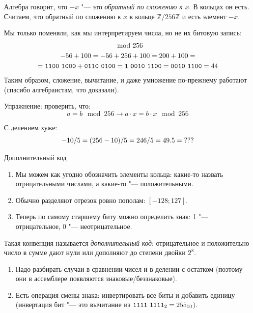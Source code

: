 \begin{frame}
	Алгебра говорит, что $-x$ "--- это \textit{обратный по сложению к $x$}.
	В кольцах он есть.
	Считаем, что обратный по сложению к $x$ в кольце $\mathbb{Z}/256\mathbb{Z}$ и есть элемент $-x$.

	Мы только поменяли, как мы интерпретируем числа, но не их битовую запись:
	\begin{gather*}
		\mod 256 \\
		-56 + 100 = -56 + 256 + 100 = 200 + 100 = \\
		= \t{1100~1000} + \t{0110~0100} = \t{1~0010~1100} = \t{0010~1100} = 44
	\end{gather*}
	Таким образом, сложение, вычитание, и даже умножение по-прежнему работают (спасибо алгебраистам, что доказали).

	Упражнение: проверить, что:
	\[ a = b \mod 256 \rightarrow a \cdot x = b \cdot x \mod 256\]

	С делением хуже:
	\[
		-10 / 5 = (256 - 10) / 5 = 246 / 5 = 49.5 = \t{???}
	\]
\end{frame}

\begin{frame}{Дополнительный код}
	\begin{enumerate}
		\item Мы можем как угодно обозначить элементы кольца: какие-то назвать отрицательными числами, а какие-то "--- положительными.
		\item Обычно разделяют отрезок ровно пополам: $[-128; 127]$.
		\item Теперь по самому старшему биту можно определить знак: 1 "--- отрицательное, 0 "--- неотрицательное.
	\end{enumerate}

	Такая конвенция называется \textit{дополнительный код}: отрицательное и положительно число в сумме дают нули или
	дополняют до степени двойки $2^8$.

	\begin{enumerate}
		\item
			Надо разбирать случаи в сравнении чисел и в делении с остатком (поэтому они в ассемблере появляются знаковые/беззнаковые).
		\item
			Есть операция смены знака: инвертировать все биты и добавить единицу (инвертация бит "--- это вычитание из $\t{1111~1111}_2=255_{10}$).
	\end{enumerate}
\end{frame}

